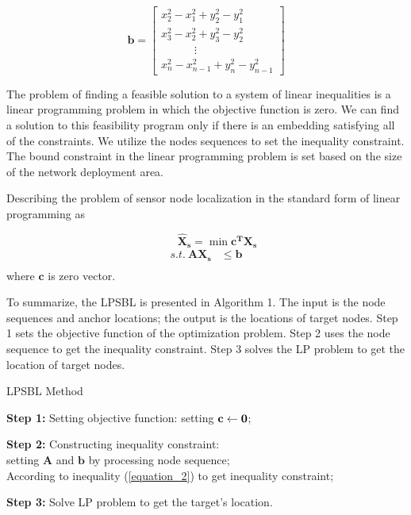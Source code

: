 \[\bm {b}=
\left[
\begin{array}{lcr}
x_2^2-x_1^2+y_2^2-y_1^2 \\
x_3^2-x_2^2+y_3^2-y_2^2 \\
  \quad \quad \quad  \vdots \\
x_n^2-x_{n-1}^2+y_n^2-y_{n-1}^2
\end{array}
\right]
\]


The problem of finding a feasible solution to a system of linear inequalities is a linear programming
problem in which the objective function is zero. 
We can find a solution to this feasibility program only if there is an embedding satisfying all of the constraints. 
We utilize the nodes sequences to set the inequality constraint.
The bound constraint in the linear programming problem is set based on the size of the network deployment area.

Describing the problem of sensor node localization in the standard form of linear programming as

 \begin{equation} \label{6}
 \quad \quad \bm {\hat X_s} = \min {\bm{c^T}\bm{X_s}}
  \end{equation}
\begin{align*}
 s.t. \   \bm {{A}{X_s}} &\le \bm {b} \\
\end{align*}
where $\bm {c}$ is zero vector.

To summarize, the LPSBL is presented in Algorithm 1. 
The input is the node sequences and anchor locations; the output is the locations of target nodes. 
Step 1 sets the objective function of the optimization problem. 
Step 2 uses the node sequence to get the inequality constraint. 
Step 3 solves the LP problem to get the location of target nodes.
\begin{algorithm}
\caption{LPSBL Method}

\textbf{Step 1:} Setting objective function: setting $\bf{c} \leftarrow \bf{0}$;

\textbf{Step 2:} Constructing inequality constraint: \\ 
\hspace{0.41in} setting $\bm{A}$ and $\bm{b}$ by processing node sequence;\\
{
{
According to inequality (\ref{equation_2}) to get inequality constraint;
}
}

\textbf{Step 3:} Solve LP problem to get the target's location.

\end{algorithm}


